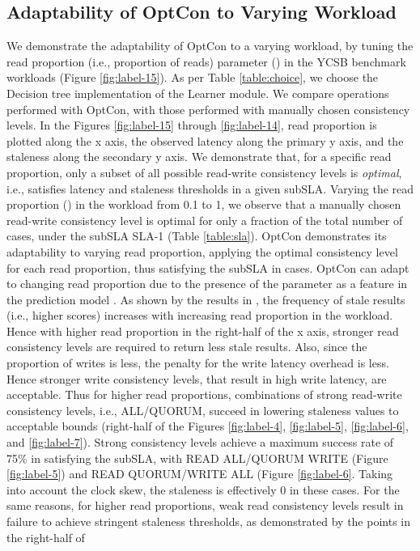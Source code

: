 \documentclass[conference]{IEEEtran}
\begin{document}
\subsection{Adaptability  of OptCon to Varying Workload}\label{sec:vary}We demonstrate the adaptability  of OptCon to a varying workload, by tuning the
read proportion (i.e., proportion of reads) parameter () in the YCSB benchmark workloads (Figure \ref{fig:label-15}).
As per Table \ref{table:choice}, we choose the Decision tree  implementation of the Learner module. We compare operations performed
with OptCon, with those performed with manually chosen consistency levels. In the Figures \ref{fig:label-15}
through \ref{fig:label-14}, read proportion is plotted along the x axis, the observed latency along the primary y
axis, and the staleness along the secondary y axis.
  We demonstrate that, for a specific read proportion, only
 a subset of all possible read-write consistency levels is \emph{optimal}, i.e., satisfies latency and
 staleness thresholds in a given subSLA. Varying the read proportion () in the workload from 0.1 to 1, we
 observe that a manually chosen read-write consistency level is optimal for only a fraction of the total number of cases,
 under the subSLA SLA-1 (Table \ref{table:sla}). OptCon demonstrates its adaptability to varying read proportion, applying
 the optimal consistency level for each read proportion, thus satisfying the subSLA in  cases. OptCon can adapt to changing read proportion due to the presence of the parameter  as a feature in the prediction model . As shown by the results in \cite{DBLP:conf/cloud/GolabRAKWG13}, the frequency of stale results (i.e., higher
 scores) increases with increasing read proportion in the workload. Hence with higher read proportion in the right-half of the x axis, stronger read consistency levels are required to return less stale results. Also, since the proportion
 of writes is less, the penalty for the write latency overhead is less. Hence stronger write consistency levels, that result in high write latency, are acceptable. Thus for higher read proportions, combinations of strong read-write consistency levels, i.e., ALL/QUORUM, succeed in lowering staleness values to acceptable bounds (right-half of the Figures \ref{fig:label-4}, \ref{fig:label-5}, \ref{fig:label-6},  and  \ref{fig:label-7}).  Strong consistency levels achieve a maximum success rate of 75\% in satisfying the subSLA, with READ ALL/QUORUM WRITE (Figure \ref{fig:label-5}) and READ QUORUM/WRITE ALL (Figure \ref{fig:label-6}. Taking into account the clock skew, the staleness is effectively 0 in these cases.  For the same reasons, for higher read proportions, weak read consistency levels result in failure to achieve stringent staleness thresholds, as demonstrated by the points in the right-half of
\end{document}
